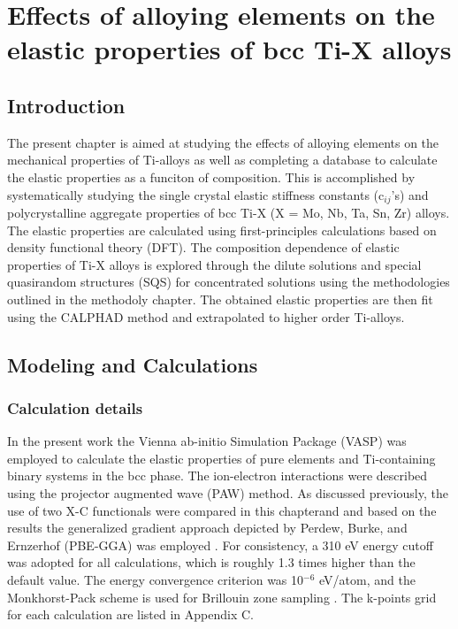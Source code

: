 \chapter{Effects of alloying elements on the elastic properties of bcc Ti-X alloys}

\section{Introduction}

The present chapter is aimed at studying the effects of alloying elements on the mechanical properties of Ti-alloys as well as completing a database to calculate the elastic properties as a funciton of composition. This is accomplished by systematically studying the single crystal elastic stiffness constants (c$_{ij}$'s) and polycrystalline aggregate properties of bcc Ti-X (X = Mo, Nb, Ta, Sn, Zr) alloys. The elastic properties are calculated using first-principles calculations based on density functional theory (DFT). The composition dependence of elastic properties of Ti-X alloys is explored through the dilute solutions and special quasirandom structures (SQS) \cite{Jiang2004} for concentrated solutions using the methodologies outlined in the methodoly chapter. The obtained elastic properties are then fit using the CALPHAD method and extrapolated to higher order Ti-alloys. 

\section{Modeling and Calculations}

\subsection{Calculation details}
In the present work the Vienna ab-initio Simulation Package (VASP) \cite{Kresse1996} was employed to calculate the elastic properties of pure elements and Ti-containing binary systems in the bcc phase. The ion-electron interactions were described using the projector augmented wave (PAW) \cite{Kresse1999,Blochl1994} method. As discussed previously, the use of two X-C functionals were compared in this chapterand and based on the results the generalized gradient approach depicted by Perdew, Burke, and Ernzerhof (PBE-GGA) was employed \cite{Perdew1996a}. For consistency, a 310 eV energy cutoff was adopted for all calculations, which is roughly 1.3 times higher than the default value. The energy convergence criterion was 10$^{-6}$ eV/atom, and the Monkhorst-Pack scheme is used for Brillouin zone sampling \cite{Kresse1996,Monkhorst1976a}. The k-points grid for each calculation are listed in Appendix C.

